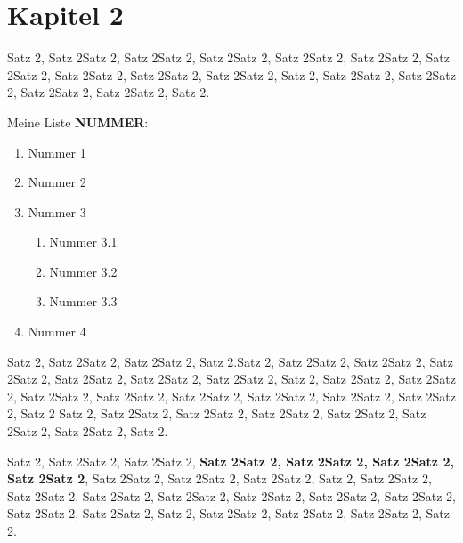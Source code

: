 \section{Kapitel 2}

    Satz 2, Satz 2Satz 2, Satz 2Satz 2, Satz 2Satz 2, Satz 2Satz 2, Satz 2Satz 2, Satz 2Satz 2, Satz 2Satz 2, Satz 2Satz 2, Satz 2Satz 2, 
    Satz 2, Satz 2Satz 2, Satz 2Satz 2, Satz 2Satz 2, Satz 2Satz 2, Satz 2.

    Meine Liste \textbf{NUMMER}:
    \begin{enumerate}
        \item Nummer 1
        \item Nummer 2
        \item Nummer 3
        \begin{enumerate}
            \item Nummer 3.1
            \item Nummer 3.2
            \item Nummer 3.3
        \end{enumerate}
        \item Nummer 4
    \end{enumerate}

    Satz 2, Satz 2Satz 2, Satz 2Satz 2, Satz 2.Satz 2, Satz 2Satz 2, Satz 2Satz 2, Satz 2Satz 2, Satz 2Satz 2, Satz 2Satz 2, Satz 2Satz 2, 
    Satz 2, Satz 2Satz 2, Satz 2Satz 2, Satz 2Satz 2, Satz 2Satz 2, Satz 2Satz 2, Satz 2Satz 2, Satz 2Satz 2, Satz 2Satz 2, Satz 2
    Satz 2, Satz 2Satz 2, Satz 2Satz 2, Satz 2Satz 2, Satz 2Satz 2, Satz 2Satz 2, Satz 2Satz 2, Satz 2.


    Satz 2, Satz 2Satz 2, Satz 2Satz 2,  \textbf{Satz 2Satz 2, Satz 2Satz 2, Satz 2Satz 2, Satz 2Satz 2}, Satz 2Satz 2, Satz 2Satz 2, Satz 2Satz 2,
    Satz 2, Satz 2Satz 2, Satz 2Satz 2, Satz 2Satz 2, Satz 2Satz 2, Satz 2Satz 2, Satz 2Satz 2, Satz 2Satz 2, Satz 2Satz 2, Satz 2Satz 2, 
    Satz 2, Satz 2Satz 2, Satz 2Satz 2, Satz 2Satz 2, Satz 2.